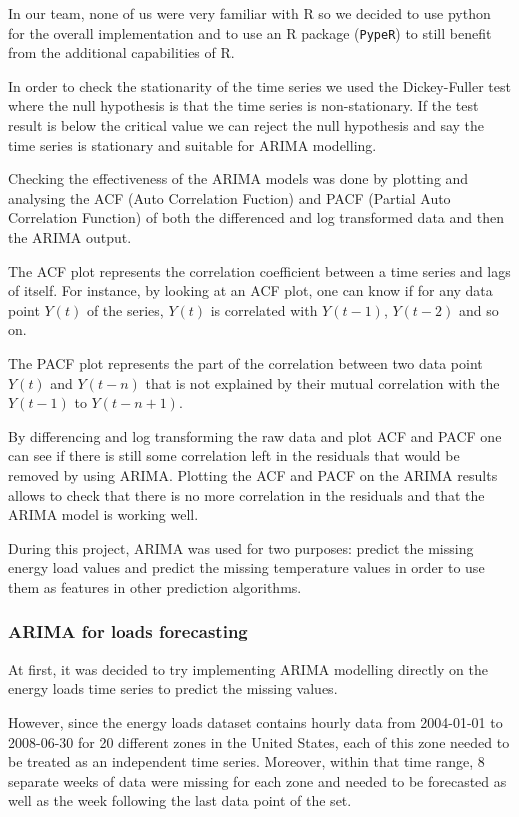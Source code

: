 \documentclass{article} %
\begin{document}
In our team, none of us were very familiar with R so we decided to use python for the overall implementation and to use an R package (\verb#PypeR#) to still benefit from the additional capabilities of R.

In order to check the stationarity of the time series we used the Dickey-Fuller test where the null hypothesis is that the time series is non-stationary. If the test result is below the critical value we can reject the null hypothesis and say the time series is stationary and suitable for ARIMA modelling.

Checking the effectiveness of the ARIMA models was done by plotting and analysing the ACF (Auto Correlation Fuction) and PACF (Partial Auto Correlation Function) of both the differenced and log transformed data and then the ARIMA output.

The ACF plot represents the correlation coefficient between a time series and lags of itself. For instance, by looking at an ACF plot, one can know if for any data point $Y(t)$ of the series, $Y(t)$ is correlated with $Y(t-1)$, $Y(t-2)$ and so on.

The PACF plot represents the part of the correlation between two data point $Y(t)$ and $Y(t-n)$ that is not explained by their mutual correlation with the $Y(t-1)$ to $Y(t-n+1)$.

By differencing and log transforming the raw data and plot ACF and PACF one can see if there is still some correlation left in the residuals that would be removed by using ARIMA. Plotting the ACF and PACF on the ARIMA results allows to check that there is no more correlation in the residuals and that the ARIMA model is working well.

During this project, ARIMA was used for two purposes: predict the missing energy load values and predict the missing temperature values in order to use them as features in other prediction algorithms. 

\subsubsection*{ARIMA for loads forecasting}

At first, it was decided to try implementing ARIMA modelling directly on the energy loads time series to predict the missing values. 

However, since the energy loads dataset contains hourly data from 2004-01-01 to 2008-06-30 for 20 different zones in the United States, each of this zone needed to be treated as an independent time series. Moreover, within that time range, 8 separate weeks of data were missing for each zone and needed to be forecasted as well as the week following the last data point of the set.
\end{document}
